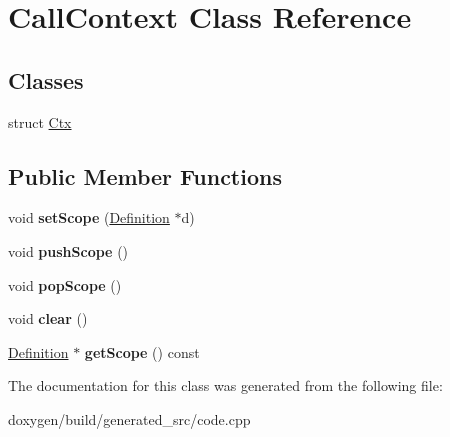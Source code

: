 \hypertarget{class_call_context}{}\section{Call\+Context Class Reference}
\label{class_call_context}
\subsection*{Classes}
\begin{DoxyCompactItemize}
\item 
struct \mbox{\hyperlink{struct_call_context_1_1_ctx}{Ctx}}
\end{DoxyCompactItemize}
\subsection*{Public Member Functions}
\begin{DoxyCompactItemize}
\item 
\mbox{\label{class_call_context_a35a22e5fec83ba7f06331797ec21ca04}} 
void {\bfseries set\+Scope} (\mbox{\hyperlink{class_definition}{Definition}} $\ast$d)
\item 
\mbox{\label{class_call_context_a78cc7e558f44a4a7057bbc87da205f30}} 
void {\bfseries push\+Scope} ()
\item 
\mbox{\label{class_call_context_ab2e212ecf1eaa4a62e551ede844d1ff1}} 
void {\bfseries pop\+Scope} ()
\item 
\mbox{\label{class_call_context_a7869d538aef25757711715bbd042ab62}} 
void {\bfseries clear} ()
\item 
\mbox{\label{class_call_context_a0d0ccabb16c9cf7013c49baf247f0a4c}} 
\mbox{\hyperlink{class_definition}{Definition}} $\ast$ {\bfseries get\+Scope} () const
\end{DoxyCompactItemize}


The documentation for this class was generated from the following file\+:\begin{DoxyCompactItemize}
\item 
doxygen/build/generated\+\_\+src/code.\+cpp\end{DoxyCompactItemize}
